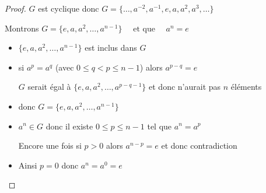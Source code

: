 \begin{frame}
\begin{proof}
$G$ est cyclique donc $G = \big\{ \ldots, a^{-2},a^{-1},e,a,a^2,a^3,\ldots \big\}$

\pause

Montrons $G = \big\{e, a, a^2, \ldots, a^{n-1}\big\} \quad  \text{ et que } \quad a^n = e$

\pause

\begin{itemize}
  \item $\big\{e, a, a^2, \ldots, a^{n-1}\big\}$ est inclus dans $G$

\pause

  \item si $a^p=a^q$ (avec $0\le q < p \le n-1$) alors $a^{p-q}=e$ 

$G$ serait égal à  $\big\{e, a, a^2, \ldots, a^{p-q-1}\big\}$ et donc n'aurait pas $n$ éléments

\pause

  \item donc $G = \big\{e, a, a^2, \ldots, a^{n-1}\big\}$

\pause

  \item $a^n \in G$ donc il existe $0 \le p \le n-1$ tel que $a^n=a^p$

Encore une fois si $p>0$ alors  $a^{n-p}=e$ et donc contradiction

\pause

  \item  Ainsi $p=0$ donc $a^n=a^0=e$
\end{itemize}
\end{proof}
\end{frame}


